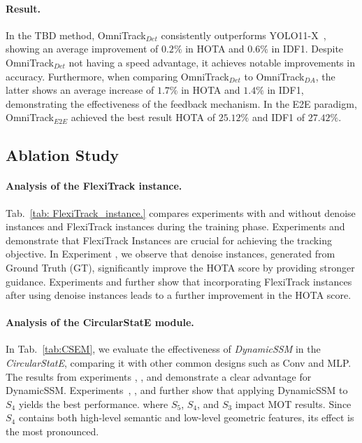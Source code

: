 \vspace{-3mm}
\paragraph{Result.}
In the TBD method, {OmniTrack\(_{Det}\)} consistently outperforms {YOLO11-X}~\cite{yolo11}, showing an average improvement of $0.2\%$ in HOTA and $0.6\%$ in IDF1. Despite {OmniTrack\(_{Det}\)} not having a speed advantage, it achieves notable improvements in accuracy. Furthermore, when comparing {OmniTrack\(_{Det}\)} to {OmniTrack\(_{DA}\)}, the latter shows an average increase of $1.7\%$ in HOTA and $1.4\%$ in IDF1, demonstrating the effectiveness of the feedback mechanism. In the E2E paradigm, {OmniTrack\(_{E2E}\)} achieved the best result HOTA of $25.12\%$ and IDF1 of $27.42\%$.

%

\subsection{Ablation Study}

\paragraph{Analysis of the FlexiTrack instance.}
Tab.~\ref{tab: FlexiTrack_instance.} compares experiments with and without denoise instances and FlexiTrack instances during the training phase. Experiments  and  demonstrate that FlexiTrack Instances are crucial for achieving the tracking objective. In Experiment , we observe that denoise instances, generated from Ground Truth (GT), significantly improve the HOTA score by providing stronger guidance. 
Experiments  and  further show that incorporating FlexiTrack instances after using denoise instances leads to a further improvement in the HOTA score.


\vspace{-3mm}
\paragraph{Analysis of the CircularStatE module.}
In Tab.~\ref{tab:CSEM}, we evaluate the effectiveness of \emph{DynamicSSM} in the \emph{CircularStatE}, comparing it with other common designs such as Conv and MLP. 
The results from experiments , , and  demonstrate a clear advantage for {DynamicSSM}. Experiments~, , and  further show that applying {DynamicSSM} to $S_4$ yields the best performance. where $S_5$, $S_4$, and $S_3$ impact MOT results. Since $S_4$ contains both high-level semantic and low-level geometric features, its effect is the most pronounced.


